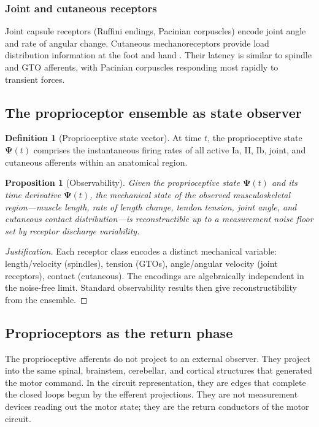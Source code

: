\documentclass[11pt,twocolumn,a4paper]{article}
\newtheorem{proposition}[theorem]{Proposition}
\theoremstyle{definition}
\newtheorem{definition}[theorem]{Definition}
\theoremstyle{remark}
\begin{document}
\subsubsection{Joint and cutaneous receptors}

Joint capsule receptors (Ruffini endings, Pacinian corpuscles) encode
joint angle and rate of angular change. Cutaneous mechanoreceptors
provide load distribution information at the foot and hand
\citep{burke1988,collins2005}. Their latency is similar to spindle and
GTO afferents, with Pacinian corpuscles responding most rapidly to
transient forces.

\subsection{The proprioceptor ensemble as state observer}

\begin{definition}[Proprioceptive state vector]
At time $t$, the proprioceptive state $\bm{\Psi}(t)$ comprises the
instantaneous firing rates of all active Ia, II, Ib, joint, and
cutaneous afferents within an anatomical region.
\end{definition}

\begin{proposition}[Observability]
Given the proprioceptive state $\bm{\Psi}(t)$ and its time derivative
$\dot{\bm{\Psi}}(t)$, the mechanical state of the observed
musculoskeletal region---muscle length, rate of length change, tendon
tension, joint angle, and cutaneous contact distribution---is
reconstructible up to a measurement noise floor set by receptor
discharge variability.
\end{proposition}

\begin{proof}[Justification]
Each receptor class encodes a distinct mechanical variable:
length/velocity (spindles), tension (GTOs), angle/angular velocity
(joint receptors), contact (cutaneous). The encodings are
algebraically independent in the noise-free limit. Standard
observability results \citep{kalman1960} then give reconstructibility
from the ensemble.
\end{proof}

\subsection{Proprioceptors as the return phase}

The proprioceptive afferents do not project to an external observer.
They project into the same spinal, brainstem, cerebellar, and
cortical structures that generated the motor command. In the circuit
representation, they are edges that complete the closed loops begun
by the efferent projections. They are not measurement devices reading
out the motor state; they are the return conductors of the motor
circuit.
\end{document}
